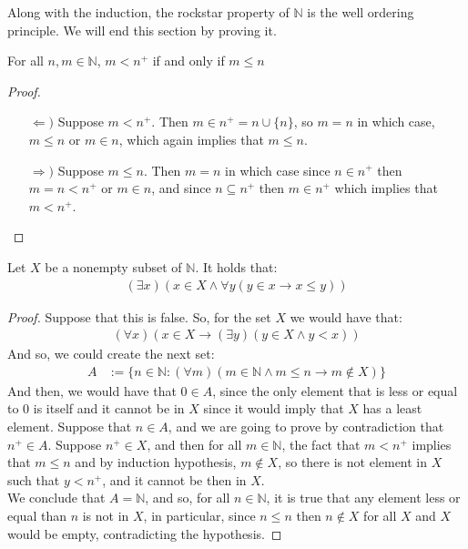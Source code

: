 \documentclass{tufte-handout}
\begin{document}
Along with the induction, the rockstar property of $\mathbb{N}$ is the well ordering principle. We will end this section by proving it.

\begin{proposition}
	For all $n, m \in \mathbb{N}$, $m < n^+$ if and only if $m \le n$
\end{proposition}
\begin{proof}
	\begin{itemize}
		\item[$\Leftarrow)$] Suppose $m < n^+$. Then $m \in n^+ = n \cup \{n\}$, so $m = n$ in which case, $m \le n$ or $m \in n$, which again implies that $m \le n$.
		\item[$\Rightarrow)$] Suppose $m \le n$. Then $m = n$ in which case since $n \in n^+$ then $m = n < n^+$ or $m \in n$, and since $n \subseteq n^+$ then $m \in n^+$ which implies that $m < n^+$. 
	\end{itemize}
\end{proof}

\begin{theorem}
	Let $X$ be a nonempty subset of $\mathbb{N}$. It holds that:
	\begin{align*}
		(\exists x)(x \in X \wedge \forall y(y \in x \rightarrow x \le y))
	\end{align*}
\end{theorem}
\begin{proof}
	Suppose that this is false. So, for the set $X$ we would have that:
	\begin{align*}
		(\forall x)(x \in X \rightarrow (\exists y)(y \in X \wedge y < x))
	\end{align*}
	And so, we could create the next set:
	\begin{align*}
		A &:= \{n \in \mathbb{N}: (\forall m)(m \in \mathbb{N} \wedge m \le n \rightarrow m \not \in X)\}
	\end{align*}
	And then, we would have that $0 \in A$, since the only element that is less or equal to $0$ is itself and it cannot be in $X$ since it would imply that $X$ has a least element. Suppose that $n \in A$, and we are going to prove by contradiction that $n^+ \in A$. Suppose $n^+ \in X$, and then for all $m \in \mathbb{N}$, the fact that $m < n^+$ implies that $m \le n$ and by induction hypothesis, $m \not \in X$, so there is not element in $X$ such that $y < n^+$, and it cannot be then in $X$.\\

	We conclude that $A = \mathbb{N}$, and so, for all $n \in \mathbb{N}$, it is true that any element less or equal than $n$ is not in $X$, in particular, since $n \le n$ then $n \not \in X$ for all $X$ and $X$ would be empty, contradicting the hypothesis.
\end{proof}
\end{document}
